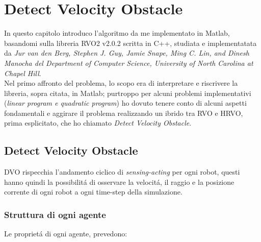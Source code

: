 
\chapter{Detect Velocity Obstacle}
\label{cap:dvo}

In questo capitolo introduco l'algoritmo da me implementato in Matlab, basandomi sulla libreria RVO2 v2.0.2 scritta in C++, studiata e implementatata da \textit{Jur van den Berg, Stephen J. Guy, Jamie Snape, Ming C. Lin, and Dinesh Manocha del Department of Computer Science, University of North Carolina at Chapel Hill}.
\\Nel primo affronto del problema, lo scopo era di interpretare e riscrivere la libreria, sopra citata, in Matlab;  purtroppo per alcuni problemi implementativi (\textit{linear program e quadratic program}) ho dovuto tenere conto di alcuni aspetti fondamentali e aggirare il problema realizzando un ibrido tra RVO e HRVO, prima esplicitato, che ho chiamato \textit{Detect Velocity Obstacle}.

\section{Detect Velocity Obstacle}
DVO rispecchia l'andamento ciclico di \textit{sensing-acting} per ogni robot, questi  hanno quindi la possibilit\'a di osservare la velocit\'a, il raggio e la posizione corrente di ogni robot a ogni time-step della simulazione. 

\subsection{Struttura di ogni agente}
Le propriet\'a di ogni agente, prevedono:

